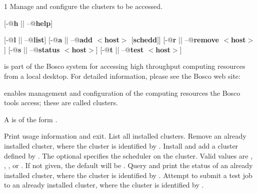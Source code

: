 \begin{ManPage}{\label{man-bosco-cluster}}{1}
{Manage and configure the clusters to be accessed. }


\Synopsis {}
[\verb@-@\textbf{h} || \verb@--@\textbf{help}]

[\verb@-@\textbf{l} || \verb@--@\textbf{list}]
[\verb@-@\textbf{a} || \verb@--@\textbf{add $<$host$>$ $[$schedd$]$}]
[\verb@-@\textbf{r} || \verb@--@\textbf{remove $<$host$>$}]
[\verb@-@\textbf{s} || \verb@--@\textbf{status $<$host$>$}]
[\verb@-@\textbf{t} || \verb@--@\textbf{test $<$host$>$}]

\Description

 is part of the Bosco system for accessing high
throughput computing resources from a local desktop.
For detailed information, please see the Bosco web site:

 enables management and configuration of the computing resources
the Bosco tools access; these are called clusters.

A  is of the form .

\begin{Options}
   {Print usage information and exit.}
   {List all installed clusters.}
   {Remove an already installed cluster,
    where the cluster is identified by .}
    {Install and add a cluster defined by .
    The optional  specifies the scheduler on the cluster.
    Valid values are , , ,  or
    .  If not given, the default will be . }
   {Query and print the status of
    an already installed cluster,
    where the cluster is identified by .}
   {Attempt to submit a test job to 
    an already installed cluster,
    where the cluster is identified by .}

\end{Options}



\end{ManPage}
